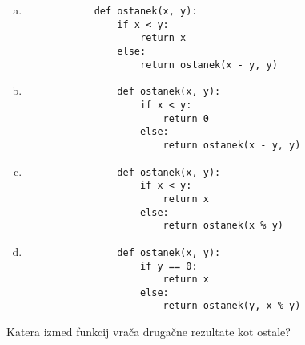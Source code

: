 \documentclass[arhiv, 10pt]{../izpit}
\begin{document}
        \begin{multicols}{2}
        \begin{enumerate}[(a)]
\item 
            \begin{verbatim}
            def ostanek(x, y):
                if x < y:
                    return x
                else:
                    return ostanek(x - y, y)
            \end{verbatim}
        
\item 
                \begin{verbatim}
                def ostanek(x, y):
                    if x < y:
                        return 0
                    else:
                        return ostanek(x - y, y)
                \end{verbatim}
            
\item 
                \begin{verbatim}
                def ostanek(x, y):
                    if x < y:
                        return x
                    else:
                        return ostanek(x % y)
                \end{verbatim}
            
\item 
                \begin{verbatim}
                def ostanek(x, y):
                    if y == 0:
                        return x
                    else:
                        return ostanek(y, x % y)
                \end{verbatim}
            
\end{enumerate}

        \end{multicols}
    
        \naloga*
        
        Katera izmed funkcij vrača drugačne rezultate kot ostale?
    
\end{document}
